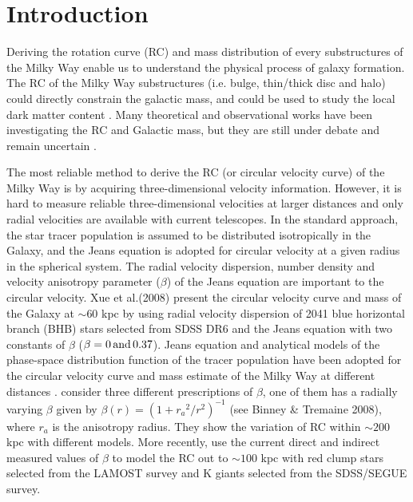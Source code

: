 \documentclass[12pt,preprint]{aastex}
\begin{document}

\section{Introduction}

Deriving the rotation curve (RC) and mass distribution of every
substructures of the Milky Way enable us to understand the physical
process of galaxy formation. The RC of the Milky Way substructures
(i.e. bulge, thin/thick disc and halo) could directly constrain the
galactic mass, and could be used to study the local dark matter
content \citep{so01, bh13}. Many theoretical and observational works
have been investigating the RC and Galactic mass, but they are still
under debate and remain uncertain \citep{we10,ne13,m96,ib95}.

The most reliable method to derive the RC (or circular velocity curve) of
the Milky Way is by acquiring three-dimensional velocity
information. However, it is hard to measure reliable
three-dimensional velocities at larger distances and only radial
velocities are available with current telescopes. In the standard
approach, the star tracer population is assumed to be distributed
isotropically in the Galaxy, and the Jeans equation \citep{bi08} is
adopted for circular velocity at a given radius in the spherical
system. The radial velocity dispersion, number density and
velocity anisotropy parameter ($\beta$) of the Jeans equation are important
to the circular velocity. Xue et al.(2008) present the circular velocity curve and mass
of the Galaxy at $\sim 60$ kpc by using radial velocity dispersion
of 2041 blue horizontal branch (BHB) stars selected from SDSS DR6
and the Jeans equation with two constants of $\beta$ ($\beta=0 \,
\rm{and} \, 0.37$). Jeans equation and analytical models of the
phase-space distribution function of the tracer population have been
adopted for the circular velocity curve and mass estimate of the Milky Way at different
distances \citep{gn10,de12,ka12}. \cite{bh14} consider three
different prescriptions of $\beta$, one of them has a radially
varying $\beta$ given by ${\beta}(r) = (1+ {{r_a}^2}/{r^2})^{-1}$
(see Binney \& Tremaine 2008), where ${r_a}$ is the  anisotropy
radius. They show the variation of RC within $\sim 200$ kpc with
different models. More recently, \cite{hu15} use the current direct
and indirect measured values of $\beta$ to model the RC out to $\sim
100$ kpc with red clump stars selected from the LAMOST survey and K
giants selected from the SDSS/SEGUE survey.
\end{document}
